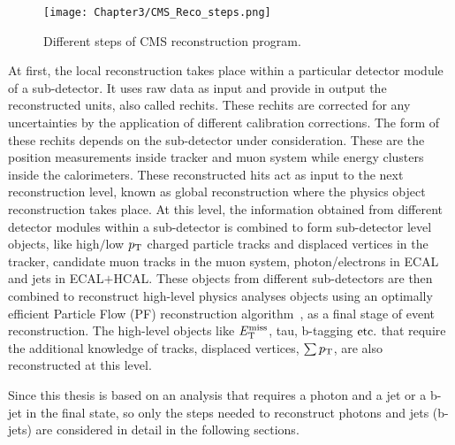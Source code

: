 \begin{figure}[h]
\begin{center}
\texttt{[image: Chapter3/CMS\_Reco\_steps.png]}
\caption{Different steps of CMS reconstruction program.}
\label{fig:CMS_reco_steps}
\end{center}
\end{figure}
\vspace{-0.2in}
At first, the local reconstruction takes place within a particular detector module of a sub-detector.
It uses raw data as input and provide in output the reconstructed units,
also called rechits. These rechits are corrected for any uncertainties by the application of different calibration corrections. 
The form of these rechits depends on the sub-detector under consideration. These are the position measurements inside tracker and muon system while
energy clusters inside the calorimeters. These reconstructed hits act as input to the next reconstruction level, known as global reconstruction
where the physics object reconstruction takes place. At this level, the information obtained from different detector modules within a sub-detector
is combined to form sub-detector level objects, like high$/$low $p_{\mathrm T}$ charged particle tracks and displaced vertices in the tracker,
candidate muon tracks in the muon system, photon/electrons in ECAL and jets in ECAL$+$HCAL.
These objects from different sub-detectors are then combined to reconstruct high-level physics analyses objects
using an optimally efficient Particle Flow (PF) reconstruction algorithm~\cite{Sirunyan:2017ulk},
as a final stage of event reconstruction. 
The high-level objects like $E_{\mathrm{T}}^{\text{miss}}$, tau, b-tagging $\mbox{etc.}$ that require the additional knowledge of
tracks, displaced vertices, $\sum{\ensuremath{p_{\mathrm T}}}$, are also reconstructed at this level. 

Since this thesis is based on an analysis that requires a photon and a jet or a b-jet in the final state, so only the steps needed to reconstruct photons and
jets (b-jets) are considered in detail in the following sections.

